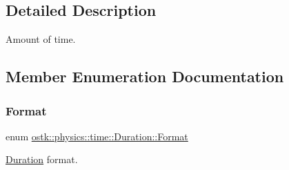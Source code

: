\subsection{Detailed Description}
Amount of time. 

\subsection{Member Enumeration Documentation}
\mbox{\label{classostk_1_1physics_1_1time_1_1_duration_a4bf616b67d15e0fbc4beb4fcc306c368}} 
\subsubsection{\texorpdfstring{Format}{Format}}
{\footnotesize\ttfamily enum \hyperlink{classostk_1_1physics_1_1time_1_1_duration_a4bf616b67d15e0fbc4beb4fcc306c368}{ostk\+::physics\+::time\+::\+Duration\+::\+Format}\hspace{0.3cm}{\ttfamily [strong]}}



\hyperlink{classostk_1_1physics_1_1time_1_1_duration}{Duration} format. 

